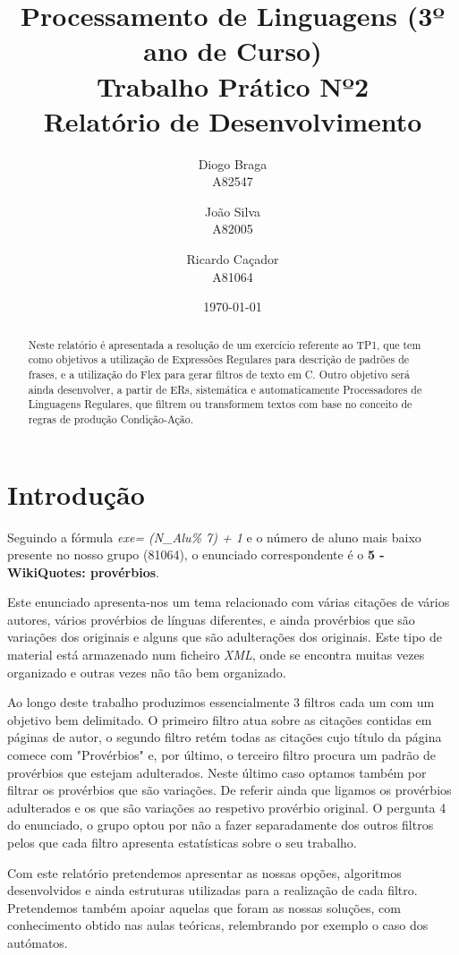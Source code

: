 \documentclass[11pt,a4paper]{report}
\title{Processamento de Linguagens (3º ano de Curso)\\
	\textbf{Trabalho Prático Nº2}\\ Relatório de Desenvolvimento}
\author{Diogo Braga\\ A82547 \and João Silva\\ A82005 \and Ricardo Caçador\\ A81064}
\date{\today}
\begin{document}
\maketitle

\begin{abstract}
	Neste relatório é apresentada a resolução de um exercício referente ao TP1, que tem como objetivos a utilização de Expressões Regulares para descrição de padrões de frases, e a utilização do Flex para gerar filtros de texto em C.
Outro objetivo será ainda desenvolver, a partir de ERs, sistemática e automaticamente Processadores de Linguagens Regulares, que filtrem ou transformem textos com base no conceito de regras de produção Condição-Ação.
\end{abstract}

\tableofcontents

\newpage

\chapter{Introdução}
\label{chap:intro}

Seguindo a fórmula \emph{exe= (N\_Alu\% 7) + 1} e o número de aluno mais baixo presente no nosso grupo (81064), o enunciado correspondente é o \textbf{5 - WikiQuotes: provérbios}.

Este enunciado apresenta-nos um tema relacionado com várias citações de vários autores, vários provérbios de línguas diferentes, e ainda provérbios que são variações dos originais e alguns que são adulterações dos originais. Este tipo de material está armazenado num ficheiro \emph{XML}, onde se encontra muitas vezes organizado e outras vezes não tão bem organizado.

Ao longo deste trabalho produzimos essencialmente 3 filtros cada um com um objetivo bem delimitado. O primeiro filtro atua sobre as citações contidas em páginas de autor, o segundo filtro retém todas as citações cujo título da página comece com "Provérbios" e, por último, o terceiro filtro procura um padrão de provérbios que estejam adulterados. Neste último caso optamos também por filtrar os provérbios que são variações. De referir ainda que ligamos os provérbios adulterados e os que são variações ao respetivo provérbio original. O pergunta 4 do enunciado, o grupo optou por não a fazer separadamente dos outros filtros pelos que cada filtro apresenta estatísticas sobre o seu trabalho.

Com este relatório pretendemos apresentar as nossas opções, algoritmos desenvolvidos e ainda estruturas utilizadas para a realização de cada filtro. Pretendemos também apoiar aquelas que foram as nossas soluções, com conhecimento obtido nas aulas teóricas, relembrando por exemplo o caso dos autómatos.
\end{document}
